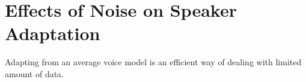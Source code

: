 \section{Effects of Noise on Speaker Adaptation}
\label{noise_speaker_adaptation}
Adapting from an average voice model is an efficient way of dealing with limited amount of data.
%

